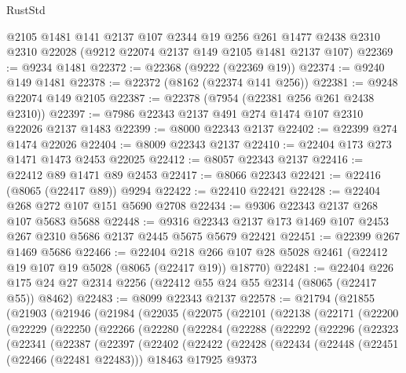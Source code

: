 \begin{lexlean}{RustStd}
\begin{coremodule}
    @2105
    @1481
    @141
    @2137
    @107
    @2344
    @19
    @256
    @261
    @1477
    @2438
    @2310
    @2310
    @22028
    (@9212 @22074 @2137 @149 @2105 @1481 @2137 @107)
@22369 := @9234 @1481
@22372 := @22368 (@9222 (@22369 @19))
@22374 := @9240 @149 @1481
@22378 := @22372 (@8162 (@22374 @141 @256))
@22381 := @9248 @22074 @149 @2105
@22387 := @22378 (@7954 (@22381 @256 @261 @2438 @2310))
@22397 := @7986 @22343 @2137 @491 @274 @1474 @107 @2310 @22026 @2137 @1483
@22399 := @8000 @22343 @2137
@22402 := @22399 @274 @1474 @22026
@22404 := @8009 @22343 @2137
@22410 := @22404 @173 @273 @1471 @1473 @2453 @22025
@22412 := @8057 @22343 @2137
@22416 := @22412 @89 @1471 @89 @2453
@22417 := @8066 @22343
@22421 := @22416 (@8065 (@22417 @89)) @9294
@22422 := @22410 @22421
@22428 := @22404 @268 @272 @107 @151 @5690 @2708
@22434 := @9306 @22343 @2137 @268 @107 @5683 @5688
@22448 := @9316 @22343 @2137 @173 @1469 @107 @2453 @267 @2310 @5686 @2137 @2445 @5675 @5679 @22421
@22451 := @22399 @267 @1469 @5686
@22466 := @22404
    @218
    @266
    @107
    @28
    @5028
    @2461
    (@22412 @19 @107 @19 @5028 (@8065 (@22417 @19)) @18770)
@22481 := @22404 @226 @175 @24 @27 @2314 @2256 (@22412 @55 @24 @55 @2314 (@8065 (@22417 @55)) @8462)
@22483 := @8099 @22343 @2137
@22578 := @21794
    (@21855
      (@21903
        (@21946
          (@21984
            (@22035
              (@22075
                (@22101
                  (@22138
                    (@22171
                      (@22200
                        (@22229
                          (@22250
                            (@22266
                              (@22280
                                (@22284
                                  (@22288
                                    (@22292
                                      (@22296
                                        (@22323
                                          (@22341
                                            (@22387
                                              (@22397
                                                (@22402
                                                  (@22422
                                                    (@22428
                                                      (@22434
                                                        (@22448
                                                          (@22451 (@22466 (@22481 @22483)))
                                                          @18463
                                                          @17925
                                                          @9373

\end{coremodule}
\end{lexlean}
